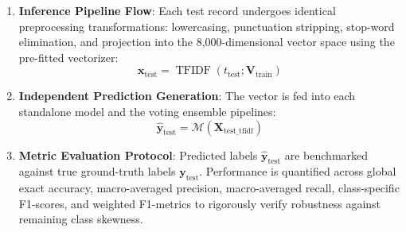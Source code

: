 \begin{enumerate}
    \item \textbf{Inference Pipeline Flow}:
    Each test record undergoes identical preprocessing transformations: lowercasing, punctuation stripping, stop-word elimination, and projection into the 8,000-dimensional vector space using the pre-fitted vectorizer:
    \begin{equation}
        \mathbf{x}_{\text{test}} = \operatorname{TFIDF}(t_{\text{test}}; \mathbf{V}_{\text{train}})
    \end{equation}
    \item \textbf{Independent Prediction Generation}:
    The vector is fed into each standalone model and the voting ensemble pipelines:
    \begin{equation}
        \hat{\mathbf{y}}_{\text{test}} = \mathcal{M}(\mathbf{X}_{\text{test\_tfidf}})
    \end{equation}
    \item \textbf{Metric Evaluation Protocol}:
    Predicted labels $\hat{\mathbf{y}}_{\text{test}}$ are benchmarked against true ground-truth labels $\mathbf{y}_{\text{test}}$. Performance is quantified across global exact accuracy, macro-averaged precision, macro-averaged recall, class-specific F1-scores, and weighted F1-metrics to rigorously verify robustness against remaining class skewness.
\end{enumerate}
